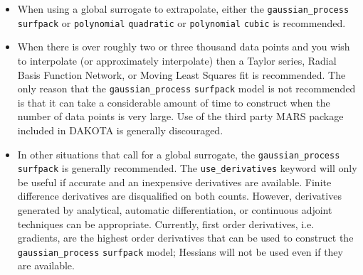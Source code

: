 \begin{itemize}
\item When using a global surrogate to extrapolate, either the
      \texttt{gaussian\_process} \texttt{surfpack} or 
      \texttt{polynomial} \texttt{quadratic} or 
      \texttt{polynomial} \texttt{cubic} is recommended.
\item When there is over roughly two or three thousand data points 
      and you wish to interpolate (or approximately interpolate) then 
      a Taylor series, Radial Basis Function Network, or Moving Least
      Squares fit is recommended.  The only reason that the 
      \texttt{gaussian\_process} \texttt{surfpack} model is not 
      recommended is that it can take a considerable amount of time
      to construct when the number of data points is very large.  Use 
      of the third party MARS package included in DAKOTA is generally 
      discouraged.
\item In other situations that call for a global surrogate, the 
      \texttt{gaussian\_process} \texttt{surfpack} is generally 
      recommended.  The \texttt{use\_derivatives} keyword will 
      only be useful if accurate and an inexpensive derivatives 
      are available. Finite difference derivatives are disqualified 
      on both counts.  However, derivatives generated by analytical,
      automatic differentiation, or continuous adjoint techniques
      can be appropriate.  Currently, first order derivatives, i.e.
      gradients, are the highest order derivatives that can be used
      to construct the \texttt{gaussian\_process} \texttt{surfpack}
      model; Hessians will not be used even if they are available.
\end{itemize}
      